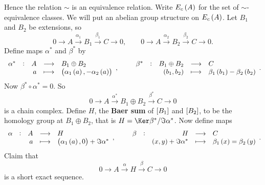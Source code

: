\pagebreak

Hence the relation $ \sim $ is an equivalence relation. Write $ E_c\br{A} $ for the set of $ \sim $-equivalence classes. We will put an abelian group structure on $ E_c\br{A} $. Let $ B_1 $ and $ B_2 $ be extensions, so
$$ 0 \to A \xrightarrow{\alpha_1} B_1 \xrightarrow{\beta_1} C \to 0, \qquad 0 \to A \xrightarrow{\alpha_2} B_2 \xrightarrow{\beta_2} C \to 0. $$
Define maps $ \alpha^* $ and $ \beta^* $ by
$$ \function[\alpha^*]{A}{B_1 \oplus B_2}{a}{\br{\alpha_1\br{a}, -\alpha_2\br{a}}}, \qquad \function[\beta^*]{B_1 \oplus B_2}{C}{\br{b_1, b_2}}{\beta_1\br{b_1} - \beta_2\br{b_2}}. $$
Now $ \beta^* \circ \alpha^* = 0 $. So
$$ 0 \to A \xrightarrow{\alpha^*} B_1 \oplus B_2 \xrightarrow{\beta^*} C \to 0 $$
is a chain complex. Define $ H $, the \textbf{Baer sum} of $ \sbr{B_1} $ and $ \sbr{B_2} $, to be the homology group at $ B_1 \oplus B_2 $, that is $ H = \Ker \beta^* / \Im \alpha^* $. Now define maps
$$ \function[\alpha]{A}{H}{a}{\br{\alpha_1\br{a}, 0} + \Im \alpha^*}, \qquad \function[\beta]{H}{C}{\br{x, y} + \Im \alpha^*}{\beta_1\br{x} = \beta_2\br{y}}. $$
Claim that
$$ 0 \to A \xrightarrow{\alpha} H \xrightarrow{\beta} C \to 0 $$
is a short exact sequence.

